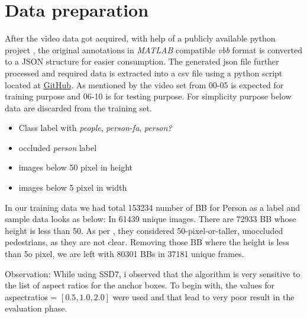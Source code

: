 \section{Data preparation}
After the video data got acquired, with help of a publicly available python project \cite{shuntasaito2015}, the original annotations in \textit{MATLAB} compatible \textit{vbb} format is converted to a JSON structure for easier consumption. The generated json file further processed and required data is extracted into a csv file using a python script located at \href{ https://github.com/Kalinga/ML/blob/master/ssd_keras_caltech/json_anno_csv_conversion.ipynb} {GitHub}. As mentioned by \cite{dollar2009pedestrian} the video set from 00-05 is expected for training purpose and 06-10 is for testing purpose.
For simplicity purpose below data are discarded from the training set.
\begin{itemize}
	\item Class label with \textit{people}, \textit{person-fa}, \textit{person?}
	\item occluded \textit{person} label
	\item images below 50 pixel in height
	\item images below 5 pixel in width
\end{itemize}

In our training data we had total 153234 number of BB for Person as a label and 
sample data looks as below:
In 61439 unique images.
There are 72933 BB whose height is less than 50. As per \cite{walk2010new}, they considered 50-pixel-or-taller, unoccluded pedestrians, as they are not clear. Removing those BB where the height is less than 5o pixel, we are left with 80301 BBs in 37181 unique frames.

Observation: While using SSD7, i observed that the algorithm is very sensitive to the list of aspect ratios for the anchor boxes. To begin with, the values for aspect\textunderscore ratios = $[0.5, 1.0, 2.0]$ were used and that lead to very poor result in the evaluation phase.

